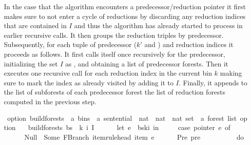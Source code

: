 \begin{isabellebody}
\begin{isamarkuptext}
In the case that the algorithm
encounters a predecessor/reduction pointer it first makes sure to not enter a cycle of reductions
by discarding any reduction indices that are contained in $I$ and thus the algorithm has already started to process in earlier
recursive calls. It then groups the reduction triples by predecessor. Subsequently, for each tuple of predecessor
($k'$ and ) and reduction indices  it proceeds as follows. It first calls itself once recursively
for the predecessor, initializing the set $I$ as , and obtaining a list of predecessor
forests. Then it executes one recursive call for each reduction index 
in the current bin $k$ making sure to mark the index  as already visited by adding it to $I$.
Finally, it appends to the list of subforests of each predecessor forest the list of reduction forests
computed in the previous step.%
\end{isamarkuptext}\isamarkuptrue%
\isamarkupfalse%
\ {\isacharparenleft}{\kern0pt}option{\isacharparenright}{\kern0pt}\ build{\isacharunderscore}{\kern0pt}forests{\isacharprime}{\kern0pt}\ {\isacharcolon}{\kern0pt}{\isacharcolon}{\kern0pt}\ {\isachardoublequoteopen}{\isacharprime}{\kern0pt}a\ bins\ {\isasymRightarrow}\ {\isacharprime}{\kern0pt}a\ sentential\ {\isasymRightarrow}\ nat\ {\isasymRightarrow}\ nat\ {\isasymRightarrow}\ nat\ set\ {\isasymRightarrow}\ {\isacharprime}{\kern0pt}a\ forest\ list\ option{\isachardoublequoteclose}\ \isanewline
\ \ {\isachardoublequoteopen}build{\isacharunderscore}{\kern0pt}forests{\isacharprime}{\kern0pt}\ bs\ {\isasymomega}\ k\ i\ I\ {\isacharequal}{\kern0pt}\ {\isacharparenleft}{\kern0pt}\isanewline
\ \ \ \ let\ e\ {\isacharequal}{\kern0pt}\ bs{\isacharbang}{\kern0pt}k{\isacharbang}{\kern0pt}i\ in\ {\isacharparenleft}{\kern0pt}\isanewline
\ \ \ \ case\ pointer\ e\ of\isanewline
\ \ \ \ \ \ Null\ {\isasymRightarrow}\ Some\ {\isacharparenleft}{\kern0pt}{\isacharbrackleft}{\kern0pt}FBranch\ {\isacharparenleft}{\kern0pt}item{\isacharunderscore}{\kern0pt}rule{\isacharunderscore}{\kern0pt}head\ {\isacharparenleft}{\kern0pt}item\ e{\isacharparenright}{\kern0pt}{\isacharparenright}{\kern0pt}\ {\isacharbrackleft}{\kern0pt}{\isacharbrackright}{\kern0pt}{\isacharbrackright}{\kern0pt}{\isacharparenright}{\kern0pt}\isanewline
\ \ \ \ {\isacharbar}{\kern0pt}\ Pre\ pre\ {\isasymRightarrow}\ {\isacharparenleft}{\kern0pt}\isanewline
\ \ \ \ \ \ \ \ do\ {\isacharbraceleft}{\kern0pt}\isanewline

\end{isabellebody}
